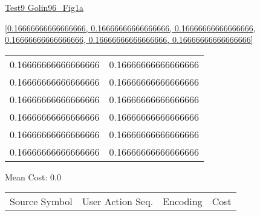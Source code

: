 \documentclass[12pt]{article}
\begin{document}
\noindent \url{Test9 Golin96_Fig1a}

\noindent \url{[0.16666666666666666, 0.16666666666666666, 0.16666666666666666, 0.16666666666666666, 0.16666666666666666, 0.16666666666666666]}

\noindent\begin{tt}
\begin{small}
\begin{bundle}{}
\end{bundle}
\end{small}
\end{tt}
\newpage%
\begin{tabular}{l l}0.16666666666666666	&	0.16666666666666666\\
0.16666666666666666	&	0.16666666666666666\\
0.16666666666666666	&	0.16666666666666666\\
0.16666666666666666	&	0.16666666666666666\\
0.16666666666666666	&	0.16666666666666666\\
0.16666666666666666	&	0.16666666666666666\\
\end{tabular}\newpage
\noindent
\noindent Mean Cost: 0.0\\
\begin{tabular}{l l l l}
Source Symbol	&	User Action Seq.	&	Encoding	&	Cost\\
\end{tabular}
\end{document}
